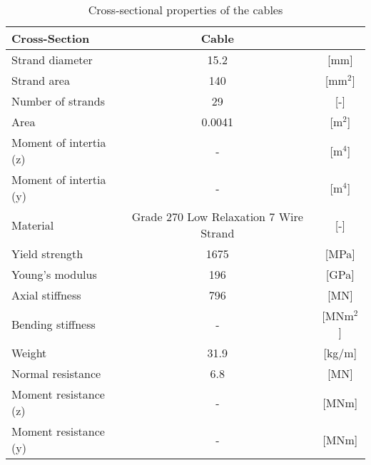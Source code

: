 \begin{table}[H]
\centering
\begin{tabular}{lcc}
\hline
Cross-Section          & Cable                                  &            \\ \hline
Strand diameter        & 15.2                                   & {[}mm{]}   \\
Strand area            & 140                                    & {[}mm$^2${]}  \\
Number of strands      & 29                                     & {[}-{]}    \\ \hline
Area                   & 0.0041                                 & {[}m$^2${]}   \\
Moment of intertia (z) & -                                      & {[}m$^4${]}   \\
Moment of intertia (y) & -                                      & {[}m$^4${]}   \\ \hline
Material               & Grade 270 Low Relaxation 7 Wire Strand & {[}-{]}    \\
Yield strength         & 1675                                   & {[}MPa{]}  \\
Young's modulus        & 196                                    & {[}GPa{]}  \\ \hline
Axial stiffness        & 796                                    & {[}MN{]}   \\
Bending stiffness      & -                                      & {[}MNm$^2${]} \\
Weight                 & 31.9                                   & {[}kg/m{]} \\ \hline
Normal resistance      & 6.8                                    & {[}MN{]}   \\
Moment resistance (z)  & -                                      & {[}MNm{]}  \\
Moment resistance (y)  & -                                      & {[}MNm{]}  \\ \hline
\end{tabular}

\caption{Cross-sectional properties of the cables}
\label{tab:cs_cable}
\end{table}